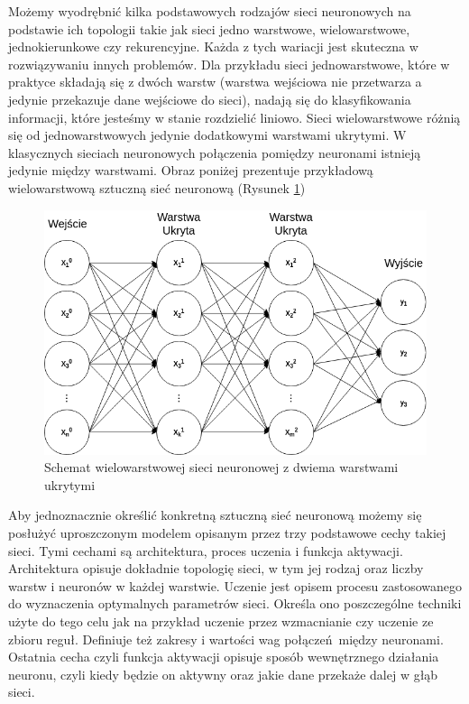 \documentclass[12pt, oneside, a4paper]{report}
\begin{document}
Możemy wyodrębnić kilka podstawowych rodzajów sieci neuronowych na podstawie ich topologii takie jak sieci jedno warstwowe, wielowarstwowe, jednokierunkowe czy rekurencyjne. Każda z tych wariacji jest skuteczna w rozwiązywaniu innych problemów. Dla przykładu sieci jednowarstwowe, które w praktyce składają się z dwóch warstw (warstwa wejściowa nie przetwarza a jedynie przekazuje dane wejściowe do sieci), nadają się do klasyfikowania informacji, które jesteśmy w stanie rozdzielić liniowo. Sieci wielowarstwowe różnią się od jednowarstwowych jedynie dodatkowymi warstwami ukrytymi. W klasycznych sieciach neuronowych połączenia pomiędzy neuronami istnieją jedynie między warstwami. Obraz poniżej prezentuje przykładową wielowarstwową sztuczną sieć neuronową (Rysunek \ref{fig: 2.2})

\begin{figure}[h]
	\centering
	\includegraphics[width=12cm]{fig212.png}
	\caption{Schemat wielowarstwowej sieci neuronowej z dwiema warstwami ukrytymi}
	\label{fig: 2.2}
\end{figure}

Aby jednoznacznie określić konkretną sztuczną sieć neuronową możemy się posłużyć uproszczonym modelem opisanym przez trzy podstawowe cechy takiej sieci. Tymi cechami są architektura, proces uczenia i funkcja aktywacji. Architektura opisuje dokładnie topologię sieci, w tym jej rodzaj oraz liczby warstw i neuronów w każdej warstwie. Uczenie jest opisem procesu zastosowanego do wyznaczenia optymalnych parametrów sieci. Określa ono poszczególne techniki użyte do tego celu jak na przykład uczenie przez wzmacnianie czy uczenie ze zbioru reguł. Definiuje też zakresy i wartości wag połączeń między neuronami. Ostatnia cecha czyli funkcja aktywacji opisuje sposób wewnętrznego działania neuronu, czyli kiedy będzie on aktywny oraz jakie dane przekaże dalej w głąb sieci.
\end{document}
